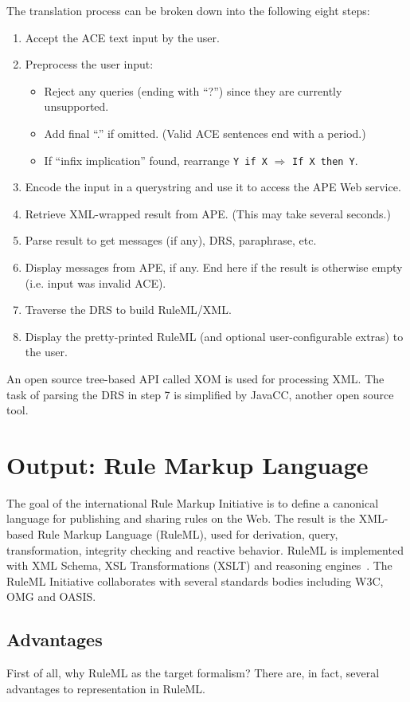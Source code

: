 \documentclass[12pt]{report}
\begin{document}
The translation process can be broken down into the following eight steps:
\begin{enumerate}
\item
Accept the ACE text input by the user.
\item
Preprocess the user input:
	\begin{itemize}
	\item Reject any queries (ending with ``?'') since they are currently unsupported.
	\item Add final ``.'' if omitted. (Valid ACE sentences end with a period.)
	\item If ``infix implication'' found, rearrange \verb|Y if X| $\Rightarrow$ \verb|If X then Y|.
	\end{itemize}
\item
Encode the input in a querystring and use it to access the APE Web service.
\item
Retrieve XML-wrapped result from APE. (This may take several seconds.)
\item
Parse result to get messages (if any), DRS, paraphrase, etc.
\item
Display messages from APE, if any. End here if the result is otherwise empty (i.e. input was invalid ACE).
\item
Traverse the DRS to build RuleML/XML.
\item
Display the pretty-printed RuleML (and optional user-configurable extras) to the user.
\end{enumerate}
An open source tree-based API called XOM is used for processing XML. The task of parsing the DRS in step 7 is simplified by JavaCC, another open source tool.

\chapter{Output: Rule Markup Language}
The goal of the international Rule Markup Initiative is to define a canonical language for publishing and sharing rules on the Web. The result is the XML-based Rule Markup Language (RuleML), used for derivation, query, transformation, integrity checking and reactive behavior. RuleML is implemented with XML Schema, XSL Transformations (XSLT) and reasoning engines~\cite{impl}. The RuleML Initiative collaborates with several standards bodies including W3C, OMG and OASIS.

\section{Advantages}
First of all, why RuleML as the target formalism? There are, in fact, several advantages to representation in RuleML.
\end{document}
